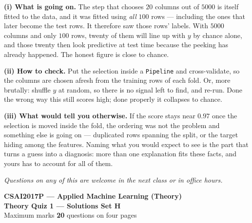 \documentclass[10pt,a4paper]{article}
\newcommand{\SetLetter}{}
\begin{document}
\vspace{4pt}

\textbf{(i) What is going on.} The step that chooses $20$ columns out of $5000$ is itself fitted to the data, and it was fitted using \emph{all} $100$ rows --- including the ones that later become the test rows. It therefore saw those rows' labels. With $5000$ columns and only $100$ rows, twenty of them will line up with $y$ by chance alone, and those twenty then look predictive at test time because the peeking has already happened. The honest figure is close to chance.\par\vspace{1mm}\textbf{(ii) How to check.} Put the selection inside a \texttt{Pipeline} and cross-validate, so the columns are chosen afresh from the training rows of each fold. Or, more brutally: shuffle $y$ at random, so there is no signal left to find, and re-run. Done the wrong way this still scores high; done properly it collapses to chance.\par\vspace{1mm}\textbf{(iii) What would tell you otherwise.} If the score stays near $0.97$ once the selection is moved inside the fold, the ordering was not the problem and something else is going on --- duplicated rows spanning the split, or the target hiding among the features. Naming what you would expect to see is the part that turns a guess into a diagnosis: more than one explanation fits these facts, and yours has to account for all of them.

\vfill

{\footnotesize\itshape Questions on any of this are welcome in the next class or in office hours.}

\newpage


\renewcommand{\SetLetter}{H}\setcounter{page}{1}

\begin{center}
{\large\bfseries CSAI2017P --- Applied Machine Learning (Theory)}\\[2pt]
{\large\bfseries Theory Quiz 1 --- Solutions \quad\textbullet\quad Set H}\\[3pt]
{\small Maximum marks \textbf{20} \quad\textbullet{} questions on four pages}
\end{center}
\vspace{2pt}

\noindent{}
\vspace{3pt}
\end{document}

